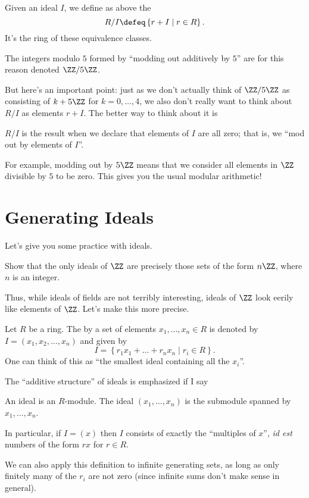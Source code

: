 \begin{definition}
	Given an ideal $I$, we define as above the 
	\[ R/I \defeq \left\{ r+I \mid r \in R \right\}. \]
	It's the ring of these equivalence classes.
\end{definition}
\begin{example}
	The integers modulo $5$ formed by ``modding out additively by $5$''
	are for this reason denoted $\ZZ / 5\ZZ$.
\end{example}
But here's an important point:
just as we don't actually think of $\ZZ/5\ZZ$ as consisting of
$k + 5\ZZ$ for $k=0,\dots,4$,
we also don't really want to think about $R/I$ as elements $r+I$.
The better way to think about it is
\begin{moral}
	$R/I$ is the result when we declare that elements of $I$ are all zero;
	that is, we ``mod out by elements of $I$''.
\end{moral}
For example, modding out by $5\ZZ$ means that we consider
all elements in $\ZZ$ divisible by $5$ to be zero.
This gives you the usual modular arithmetic!


\section{Generating Ideals}
Let's give you some practice with ideals.

\begin{exercise}
	Show that the only ideals of $\ZZ$ are precisely those
	sets of the form $n\ZZ$, where $n$ is an integer.
\end{exercise}

Thus, while ideals of fields are not terribly interesting,
ideals of $\ZZ$ look eerily like elements of $\ZZ$.
Let's make this more precise.
\begin{definition}
	Let $R$ be a ring.
	The  by a set of elements $x_1, \dots, x_n \in R$
	is denoted by $I = (x_1, x_2, \dots, x_n)$
	and given by
	\[
		I = \left\{ r_1x_1 + \dots + r_nx_n \mid r_i \in R \right\}.
	\]
	One can think of this as ``the smallest ideal containing all the $x_i$''.
\end{definition}
The ``additive structure'' of ideals is emphasized if I say
\begin{moral}
	An ideal is an $R$-module.
	The ideal $(x_1, \dots, x_n)$ is the submodule
	spanned by $x_1, \dots, x_n$.
\end{moral}
In particular, if $I = (x)$ then $I$ consists of exactly the
``multiples of $x$'', \emph{id est}
numbers of the form $rx$ for $r \in R$.
\begin{remark}
	We can also apply this definition to infinite generating sets, as long as
	only finitely many of the $r_i$ are not zero (since infinite sums
	don't make sense in general).
\end{remark}

